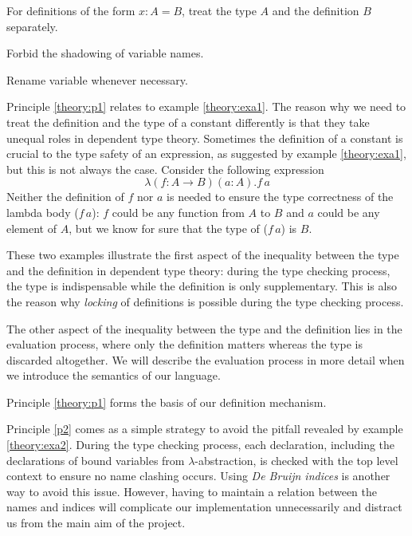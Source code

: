\begin{principle} \label{theory:p1}
  For definitions of the form $x : A = B$, treat the type $A$ and the definition $B$ separately.
\end{principle}

\begin{principle} \label{p2}
  Forbid the shadowing of variable names.
\end{principle}

\begin{principle} \label{p3}
  Rename variable whenever necessary. 
\end{principle}

Principle \ref{theory:p1} relates to example \ref{theory:exa1}. The reason why we need to treat the definition and the type of a constant differently is that they take unequal roles in dependent type theory. Sometimes the definition of a constant is crucial to the type safety of an expression, as suggested by example \ref{theory:exa1}, but this is not always the case. Consider the following expression
\[\lambda (f : A \to B) (a : A).f\,a\]
Neither the definition of $f$ nor $a$ is needed to ensure the type correctness of the lambda body ($f\,a$): $f$ could be any function from $A$ to $B$ and $a$ could be any element of $A$, but we know for sure that the type of ($f\,a$) is $B$. 

These two examples illustrate the first aspect of the inequality between the type and the definition in dependent type theory: during the type checking process, the type is indispensable while the definition is only supplementary. This is also the reason why \emph{locking} of definitions is possible during the type checking process.

The other aspect of the inequality between the type and the definition lies in the evaluation process, where only the definition matters whereas the type is discarded altogether. We will describe the evaluation process in more detail when we introduce the semantics of our language.

Principle \ref{theory:p1} forms the basis of our definition mechanism.

Principle \ref{p2} comes as a simple strategy to avoid the pitfall revealed by example \ref{theory:exa2}. During the type checking process, each declaration, including the declarations of bound variables from $\lambda$-abstraction, is checked with the top level context to ensure no name clashing occurs. Using \emph{De Bruijn indices} is another way to avoid this issue. However, having to maintain a relation between the names and indices will complicate our implementation unnecessarily and distract us from the main aim of the project. 

